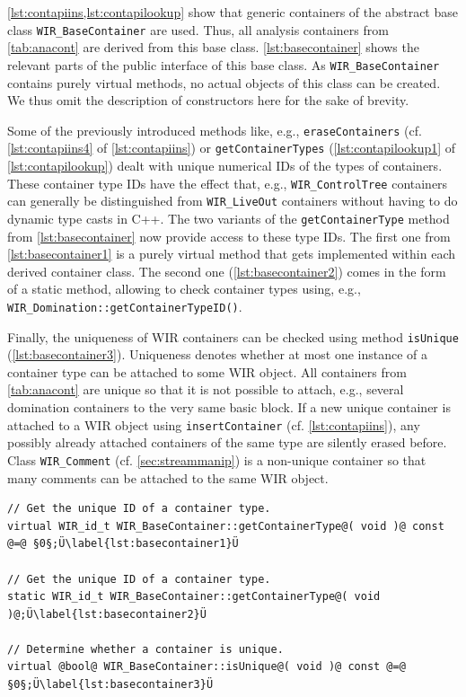 \cref{lst:contapiins,lst:contapilookup} show that generic containers of the abstract base class \texttt{WIR\_BaseContainer} are used.
Thus, all analysis containers from \cref{tab:anacont} are derived from this base class.
\cref{lst:basecontainer} shows the relevant parts of the public interface of this base class.
As \texttt{WIR\_BaseContainer} contains purely virtual methods, no actual objects of this class can be created.
We thus omit the description of constructors here for the sake of brevity.

Some of the previously introduced methods like, e.g., \texttt{eraseContainers} (cf. \cref{lst:contapiins4} of \cref{lst:contapiins}) or \texttt{getCon\-tainerTypes} (\cref{lst:contapilookup1} of \cref{lst:contapilookup})  dealt with unique numerical IDs of the types of containers.
These container type IDs have the effect that, e.g., \texttt{WIR\_ControlTree} containers can generally be distinguished from \texttt{WIR\_LiveOut} containers without having to do dynamic type casts in C++.
The two variants of the \texttt{getContainer\-Type} method from \cref{lst:basecontainer} now provide access to these type IDs.
The first one from \cref{lst:basecontainer1} is a purely virtual method that gets implemented within each derived container class.
The second one (\cref{lst:basecontainer2}) comes in the form of a static method, allowing to check container types using, e.g., \texttt{WIR\_Domination::getContainerTypeID()}.

Finally, the uniqueness of \gls{WIR} containers can be checked using method \texttt{is\-Unique} (\cref{lst:basecontainer3}).
Uniqueness denotes whether at most one instance of a container type can be attached to some \gls{WIR} object.
All containers from \cref{tab:anacont} are unique so that it is not possible to attach, e.g., several domination containers to the very same basic block.
If a new unique container is attached to a \gls{WIR} object using \texttt{insertContainer} (cf. \cref{lst:contapiins}), any possibly already attached containers of the same type are silently erased before.
Class \texttt{WIR\_Comment} (cf. \cref{sec:streammanip}) is a non-unique container so that many comments can be attached to the same \gls{WIR} object.

\begin{lstlisting}[style=code,float=h,caption={Type Handling of Class \texttt{WIR\_BaseContainer}},label=lst:basecontainer]
// Get the unique ID of a container type.
virtual WIR_id_t WIR_BaseContainer::getContainerType@( void )@ const @=@ §0§;Ü\label{lst:basecontainer1}Ü

// Get the unique ID of a container type.
static WIR_id_t WIR_BaseContainer::getContainerType@( void )@;Ü\label{lst:basecontainer2}Ü

// Determine whether a container is unique.
virtual @bool@ WIR_BaseContainer::isUnique@( void )@ const @=@ §0§;Ü\label{lst:basecontainer3}Ü
\end{lstlisting}


